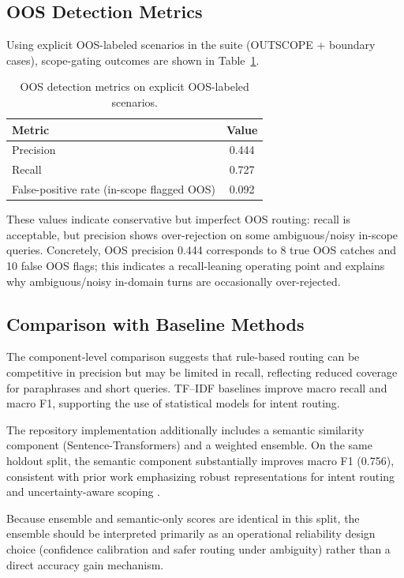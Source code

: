 \documentclass[12pt,onecolumn]{report}
\begin{document}
\subsection{OOS Detection Metrics}
Using explicit OOS-labeled scenarios in the suite (OUTSCOPE + boundary cases), scope-gating outcomes are shown in Table~\ref{tab:oos-metrics}.

\begin{table}[t]
\caption{OOS detection metrics on explicit OOS-labeled scenarios.}
\label{tab:oos-metrics}
\centering
\small
\renewcommand{\arraystretch}{1.25}
\setlength{\tabcolsep}{6pt}
\begin{tabular}{l c}
\toprule
\textbf{Metric} & \textbf{Value}\\
\midrule
Precision & 0.444\\
Recall & 0.727\\
False-positive rate (in-scope flagged OOS) & 0.092\\
\bottomrule
\end{tabular}
\end{table}

These values indicate conservative but imperfect OOS routing: recall is acceptable, but precision shows over-rejection on some ambiguous/noisy in-scope queries.
Concretely, OOS precision 0.444 corresponds to 8 true OOS catches and 10 false OOS flags; this indicates a recall-leaning operating point and explains why ambiguous/noisy in-domain turns are occasionally over-rejected.

\subsection{Comparison with Baseline Methods}
The component-level comparison suggests that rule-based routing can be competitive in precision but may be limited in recall, reflecting reduced coverage for paraphrases and short queries. TF--IDF baselines improve macro recall and macro F1, supporting the use of statistical models for intent routing.

The repository implementation additionally includes a semantic similarity component (Sentence-Transformers) and a weighted ensemble. On the same holdout split, the semantic component substantially improves macro F1 (0.756), consistent with prior work emphasizing robust representations for intent routing and uncertainty-aware scoping \cite{larson2019clinc150,casanueva2020banking77}.

Because ensemble and semantic-only scores are identical in this split, the ensemble should be interpreted primarily as an operational reliability design choice (confidence calibration and safer routing under ambiguity) rather than a direct accuracy gain mechanism.
\end{document}
